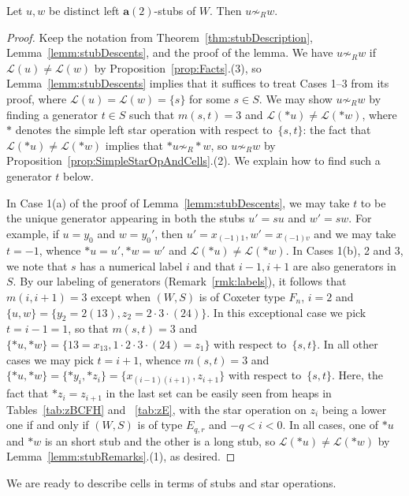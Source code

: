 \documentclass[ALCO,Unicode,published]{cedram}
\newcommand{\call}{\mathcal{L}}
\newcommand{\la}{\mathbf{a}}
\begin{document}
\begin{prop}
    \label{prop:distinctCells}
    Let $u,w$ be distinct left $\la(2)$-stubs of $W$. Then $u\not\sim_R w$. 
\end{prop}
\begin{proof}
    Keep the notation from Theorem~\ref{thm:stubDescription}, Lemma~\ref{lemm:stubDescents}, and the proof of
    the lemma.  We have $u\not\sim_R w$ if $\call(u)\neq \call(w)$ by Proposition~\ref{prop:Facts}.(3), so
    Lemma~\ref{lemm:stubDescents} implies that it suffices to treat Cases 1--3 from its proof, where
    $\call(u)=\call(w)=\{s\}$ for some $s\in S$. We may show $u\not\sim_R w$ by finding a generator
    $t\in S$ such that $m(s,t)=3$ and $\call(*u)\neq \call(*w)$, where $*$ denotes the simple left
    star operation with respect to~$\{s,t\}$: the fact that $\call(*u)\neq \call(*w)$ implies that
    $*u\not\sim_R *w$, so $u\not\sim_R w$ by Proposition~\ref{prop:SimpleStarOpAndCells}.(2). We explain how to
    find such a generator $t$ below.

    In Case 1(a) of the proof of Lemma~\ref{lemm:stubDescents}, we may take $t$ to be the unique
    generator appearing in both the stubs $u'=su$ and $w'=sw$.  For example, if $u=y_0$ and
    $w=y_0'$, then $u'= x_{(-1)1}, w'=x_{(-1)v}$ and we may take $t=-1$, whence $*u=u', *w=w'$ and
    $\call(*u)\neq \call(*w)$.  In Cases 1(b), 2 and 3, we note that $s$ has a numerical label $i$
    and that $i-1,i+1$ are also generators in $S$. By our labeling of generators
    (Remark~\ref{rmk:labels}), it follows that $m(i,i+1)=3$ except when $(W,S)$ is of Coxeter type $F_n$,
    $i=2$ and $\{u,w\}=\{y_2=2(13),z_2=2\cdot 3\cdot (24)\}$.  In this exceptional case we pick
    $t=i-1=1$, so that $m(s,t)=3$ and $\{*u,*w\}=\{13=x_{13},1\cdot 2\cdot 3\cdot (24)=z_1\}$ with
    respect to~$\{s,t\}$. In all other cases we may pick $t=i+1$, whence $m(s,t)=3$ and
    $\{*u,*w\}=\{*y_i,*z_i\}=\{x_{(i-1)(i+1)},z_{i+1}\}$ with respect to~$\{s,t\}$. Here, the fact
    that $*z_i=z_{i+1}$ in the last set can be easily seen from heaps in Tables~\ref{tab:zBCFH} and
   ~\ref{tab:zE}, with the star operation on $z_i$ being a lower one if and only if $(W,S)$ is of
    type $E_{q,r}$ and $-q<i<0$. In all cases, one of $*u$ and $*w$ is an short stub and the other
    is a long stub, so $\call(*u)\neq \call(*w)$ by Lemma~\ref{lemm:stubRemarks}.(1), as desired.
\end{proof}

We are ready to describe cells in terms of stubs and star operations.
\end{document}
